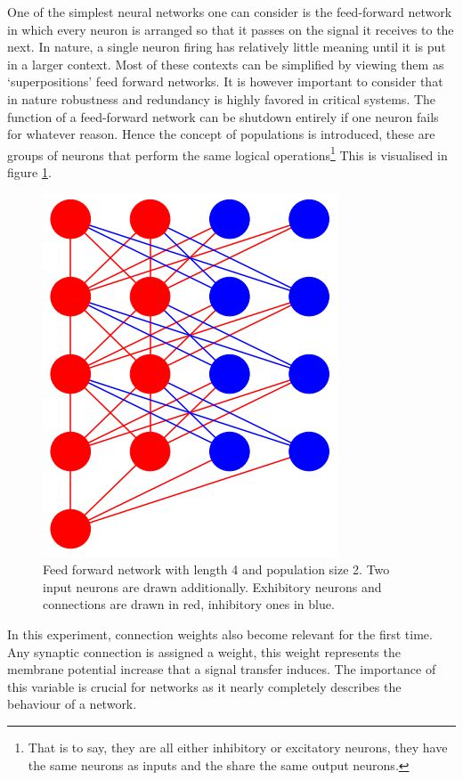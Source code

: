 \documentclass[a4paper,twocolumn]{article}
\begin{document}
One of the simplest neural networks one can consider is the feed-forward
network in which every neuron is arranged so that it passes on the signal it
receives to the next. In nature, a single neuron firing has relatively little
meaning until it is put in a larger context. Most of these contexts can be
simplified by viewing them as `superpositions' feed forward networks. It is
however important to consider that in nature robustness and redundancy is
highly favored in critical systems. The function of a feed-forward network can
be shutdown entirely if one neuron fails for whatever reason. Hence the concept
of populations is introduced, these are groups of neurons that perform the same
logical operations\footnote{That is to say, they are all either inhibitory or
excitatory neurons, they have the same neurons as inputs and the share the same
output neurons.} This is visualised in figure \ref{fig:feed-forward}.

\begin{figure}[ht]
    \centering
    \includegraphics[width=.3\textwidth]{figures/feedforwardnetwork-cropped.png}
    \caption{Feed forward network with length 4 and population size 2. Two input
        neurons are drawn additionally. Exhibitory neurons and connections are drawn
        in red, inhibitory ones in blue.}
    \label{fig:feed-forward}
\end{figure}

In this experiment, connection weights also become relevant for the first time.
Any synaptic connection is assigned a weight, this weight represents the
membrane potential increase that a signal transfer induces. The importance of
this variable is crucial for networks as it nearly completely describes the
behaviour of a network.
\end{document}
